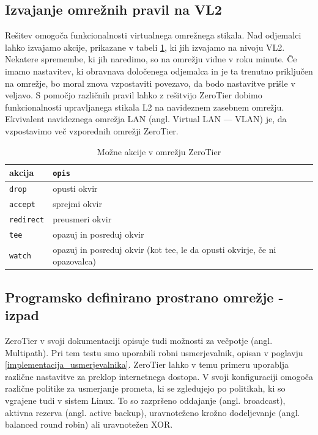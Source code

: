 \documentclass[a4paper, 12pt]{book}
\begin{document}
\subsection{Izvajanje omrežnih pravil na VL2}
Rešitev omogoča funkcionalnosti virtualnega omrežnega stikala. Nad odjemalci lahko izvajamo akcije, prikazane v tabeli \ref{tabela_zt_akcije}, ki jih izvajamo na nivoju VL2. Nekatere spremembe, ki jih naredimo, so na omrežju vidne v roku minute. Če imamo nastavitev, ki obravnava določenega odjemalca in je ta trenutno priključen na omrežje, bo moral znova vzpostaviti povezavo, da bodo nastavitve prišle v veljavo. S pomočjo različnih pravil lahko z rešitvijo ZeroTier dobimo funkcionalnosti upravljanega stikala L2 na navideznem zasebnem omrežju. Ekvivalent navideznega omrežja LAN (angl. Virtual LAN --- VLAN) je, da vzpostavimo več vzporednih omrežji ZeroTier.%

\begin{table}[H]
\begin{center}
\noindent\begin{tabular}{p{}|p{}}
akcija & {\tt opis}\\ \hline
{\tt drop} & opusti okvir \\
{\tt accept}   & sprejmi okvir \\
{\tt redirect} & preusmeri okvir \\
{\tt tee}   & opazuj in posreduj okvir \\
{\tt watch} & opazuj in posreduj okvir (kot tee, le da opusti okvirje, če ni opazovalca) \\
\end{tabular}
\end{center}
\caption{Možne akcije v omrežju ZeroTier}
\label{tabela_zt_akcije}
\end{table}
\subsection{Programsko definirano prostrano omrežje - izpad}
ZeroTier v svoji dokumentaciji opisuje tudi možnosti za večpotje (angl. Multipath). Pri tem testu smo uporabili robni usmerjevalnik, opisan v poglavju \ref{implementacija_usmerjevalnika}. ZeroTier lahko v temu primeru uporablja različne nastavitve za preklop internetnega dostopa. V svoji konfiguraciji omogoča različne politike za usmerjanje prometa, ki se zgledujejo po politikah, ki so vgrajene tudi v sistem Linux. To so razpršeno oddajanje (angl. broadcast), aktivna rezerva (angl. active backup), uravnoteženo krožno dodeljevanje (angl. balanced round robin) ali uravnotežen XOR.
\end{document}
